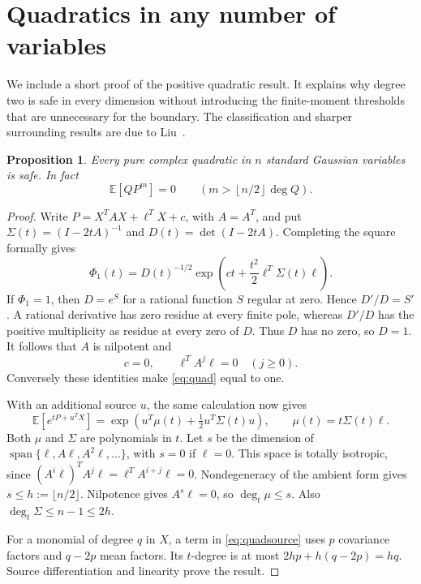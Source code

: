 \documentclass[11pt]{article}
\newtheorem{proposition}[theorem]{Proposition}
\theoremstyle{definition}\newtheorem{definition}[theorem]{Definition}
\theoremstyle{remark}\newtheorem{remark}[theorem]{Remark}
\newcommand{\E}{\mathbb E}
\DeclareMathOperator{\Span}{span}
\begin{document}
\section{Quadratics in any number of variables}\label{sec:quadratics}

We include a short proof of the positive quadratic result. It explains
why degree two is safe in every dimension without introducing the
finite-moment thresholds that are unnecessary for the boundary.
The classification and sharper surrounding results are due to
Liu~\cite[Theorem~2.1]{Liu}.

\begin{proposition}\label{prop:quadratic}
Every pure complex quadratic in $n$ standard Gaussian variables is safe.
In fact
\[
 \E[QP^m]=0\qquad\left(m>\left\lfloor n/2\right\rfloor\deg Q\right).
\]
\end{proposition}
\begin{proof}
Write $P=X^TAX+\ell^TX+c$, with $A=A^T$, and put
$\Sigma(t)=(I-2tA)^{-1}$ and $D(t)=\det(I-2tA)$. Completing the
square formally gives
\begin{equation}\label{eq:quad}
 \Phi_1(t)=D(t)^{-1/2}
   \exp\!\left(ct+\frac{t^2}{2}\ell^T\Sigma(t)\ell\right).
\end{equation}
If $\Phi_1=1$, then $D=e^S$ for a rational function $S$ regular at
zero. Hence $D'/D=S'$. A rational derivative has zero residue at every
finite pole, whereas $D'/D$ has the positive multiplicity as residue at
every zero of $D$. Thus $D$ has no zero, so $D=1$. It follows that
$A$ is nilpotent and
\[
 c=0,\qquad \ell^TA^j\ell=0\quad(j\geq0).
\]
Conversely these identities make \eqref{eq:quad} equal to one.

With an additional source $u$, the same calculation now gives
\begin{equation}\label{eq:quadsource}
 \E[e^{tP+u^TX}]
   =\exp\!\left(u^T\mu(t)+\tfrac12u^T\Sigma(t)u\right),
 \qquad \mu(t)=t\Sigma(t)\ell.
\end{equation}
Both $\mu$ and $\Sigma$ are polynomials in $t$. Let $s$ be the dimension
of $\Span\{\ell,A\ell,A^2\ell,\ldots\}$, with $s=0$ if $\ell=0$.
This space is totally isotropic, since
$(A^i\ell)^TA^j\ell=\ell^TA^{i+j}\ell=0$. Nondegeneracy of the
ambient form gives $s\leq h:=\lfloor n/2\rfloor$. Nilpotence gives
$A^s\ell=0$, so $\deg_t\mu\leq s$. Also
$\deg_t\Sigma\leq n-1\leq2h$.

For a monomial of degree $q$ in $X$, a term in
\eqref{eq:quadsource} uses $p$ covariance factors and $q-2p$ mean
factors. Its $t$-degree is at most
$2hp+h(q-2p)=hq$. Source differentiation and linearity prove the result.
\end{proof}
\end{document}
